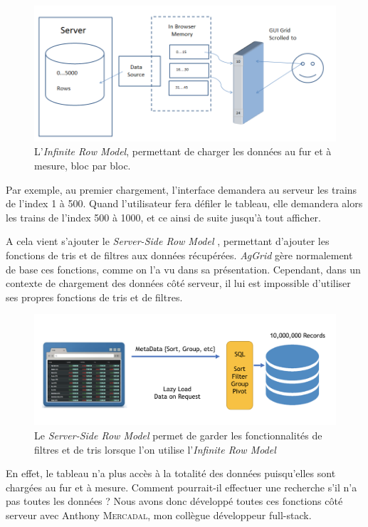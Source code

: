   \begin{figure}[H]
    \centering
    \includegraphics[width=1\linewidth]{img/high-level.png}
    \caption{
L'\textit{Infinite Row Model}, permettant de charger les données au fur et à mesure, bloc par bloc.
    }
  \end{figure}
  
Par exemple, au premier chargement, l'interface demandera au serveur les trains de l'index 1 à 500. Quand l'utilisateur fera défiler le tableau, elle demandera alors les trains de l'index 500 à 1000, et ce ainsi de suite jusqu'à tout afficher.

A cela vient s'ajouter le
\textit{Server-Side Row Model}
, permettant d'ajouter les fonctions de tris et de filtres aux données récupérées.
\textit{AgGrid} gère normalement de base ces fonctions, comme on l'a vu dans sa présentation. Cependant, dans un contexte de chargement des données côté serveur, il lui est impossible d'utiliser ses propres fonctions de tris et de filtres.

  \begin{figure}[H]
    \centering
    \includegraphics[width=1\linewidth]{img/enterprise-row-model.png}
    \caption{
Le \textit{Server-Side Row Model} permet de garder les fonctionnalités de filtres et de tris lorsque l'on utilise l'\textit{Infinite Row Model}
    }
  \end{figure}
  
En effet, le tableau n'a plus accès à la totalité des données puisqu'elles sont chargées au fur et à mesure. Comment pourrait-il effectuer une recherche s'il n'a pas toutes les données ? Nous avons donc développé toutes ces fonctions côté serveur avec Anthony \textsc{Mercadal}, mon collègue développeur \gls{full-stack}.


